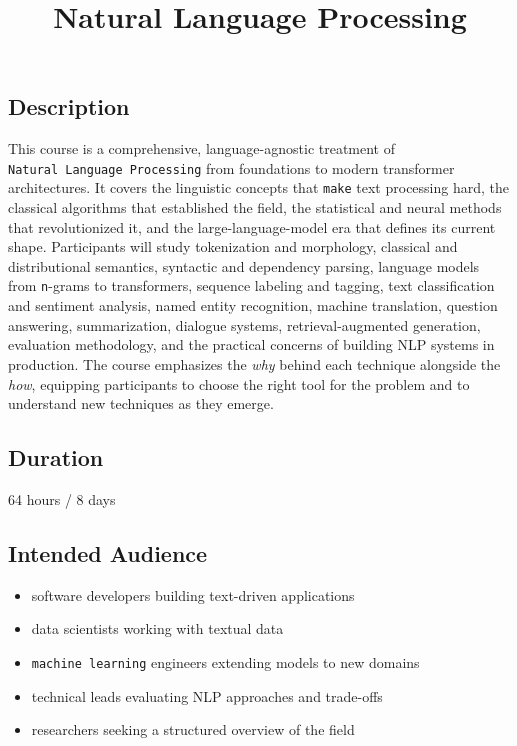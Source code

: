 \documentclass[
]{article}
\title{Natural Language Processing}
\author{}
\date{}
\providecommand{\tightlist}{%
  \setlength{\itemsep}{0pt}\setlength{\parskip}{0pt}}
\begin{document}
\maketitle

\subsection{Description}\label{description}

This course is a comprehensive, language-agnostic treatment of
\texttt{Natural\ Language\ Processing} from foundations to modern
transformer architectures. It covers the linguistic concepts that
\texttt{make} text processing hard, the classical algorithms that
established the field, the statistical and neural methods that
revolutionized it, and the large-language-model era that defines its
current shape. Participants will study tokenization and morphology,
classical and distributional semantics, syntactic and dependency
parsing, language models from \texttt{n}-grams to transformers, sequence
labeling and tagging, text classification and sentiment analysis, named
entity recognition, machine translation, question answering,
summarization, dialogue systems, retrieval-augmented generation,
evaluation methodology, and the practical concerns of building NLP
systems in production. The course emphasizes the \emph{why} behind each
technique alongside the \emph{how}, equipping participants to choose the
right tool for the problem and to understand new techniques as they
emerge.

\subsection{Duration}\label{duration}

64 hours / 8 days

\subsection{Intended Audience}\label{intended-audience}

\begin{itemize}
\tightlist
\item
  software developers building text-driven applications
\item
  data scientists working with textual data
\item
  \texttt{machine\ learning} engineers extending models to new domains
\item
  technical leads evaluating NLP approaches and trade-offs
\item
  researchers seeking a structured overview of the field
\end{itemize}
\end{document}
